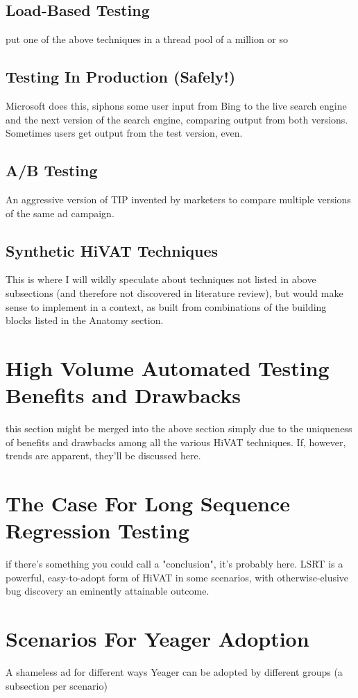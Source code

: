 \subsection{Load-Based Testing}
put one of the above techniques in a thread pool of a million or so %

\subsection{Testing In Production (Safely!)}
Microsoft does this, siphons some user input from Bing to the live search engine and the next version of the search engine, comparing output from both versions. Sometimes users get output from the test version, even. %

\subsection{A/B Testing}
An aggressive version of TIP invented by marketers to compare multiple versions of the same ad campaign. %

\subsection{Synthetic HiVAT Techniques}
This is where I will wildly speculate about techniques not listed in above subsections (and therefore not discovered in literature review), but would make sense to implement in a context, as built from combinations of the building blocks listed in the Anatomy section. %

\section{High Volume Automated Testing Benefits and Drawbacks}
  this section might be merged into the above section simply due to the uniqueness of benefits and drawbacks among all the various HiVAT techniques. If, however, trends are apparent, they'll be discussed here. %

\section{The Case For Long Sequence Regression Testing}
  if there's something you could call a "conclusion", it's probably here. LSRT is a powerful, easy-to-adopt form of HiVAT in some scenarios, with otherwise-elusive bug discovery an eminently attainable outcome. %

\section{Scenarios For Yeager Adoption}
A shameless ad for different ways Yeager can be adopted by different groups (a subsection per scenario) %
